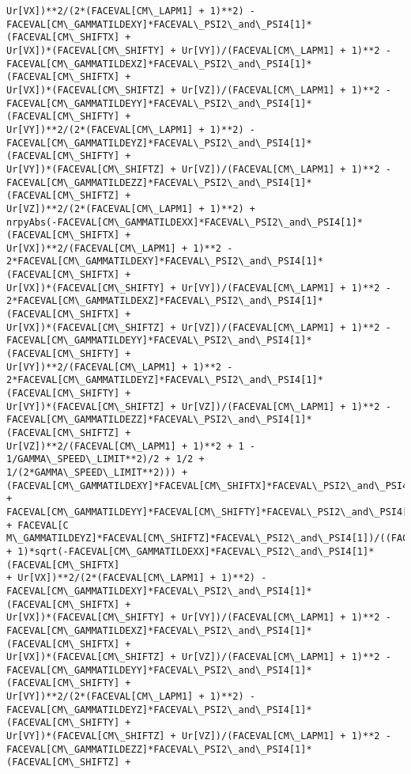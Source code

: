 \documentclass[landscape,letterpaper,10pt,english]{article}
\begin{document}
\begin{Verbatim}[commandchars=\\\{\}]
Ur[VX])**2/(2*(FACEVAL[CM\_LAPM1] + 1)**2) -
FACEVAL[CM\_GAMMATILDEXY]*FACEVAL\_PSI2\_and\_PSI4[1]*(FACEVAL[CM\_SHIFTX] +
Ur[VX])*(FACEVAL[CM\_SHIFTY] + Ur[VY])/(FACEVAL[CM\_LAPM1] + 1)**2 -
FACEVAL[CM\_GAMMATILDEXZ]*FACEVAL\_PSI2\_and\_PSI4[1]*(FACEVAL[CM\_SHIFTX] +
Ur[VX])*(FACEVAL[CM\_SHIFTZ] + Ur[VZ])/(FACEVAL[CM\_LAPM1] + 1)**2 -
FACEVAL[CM\_GAMMATILDEYY]*FACEVAL\_PSI2\_and\_PSI4[1]*(FACEVAL[CM\_SHIFTY] +
Ur[VY])**2/(2*(FACEVAL[CM\_LAPM1] + 1)**2) -
FACEVAL[CM\_GAMMATILDEYZ]*FACEVAL\_PSI2\_and\_PSI4[1]*(FACEVAL[CM\_SHIFTY] +
Ur[VY])*(FACEVAL[CM\_SHIFTZ] + Ur[VZ])/(FACEVAL[CM\_LAPM1] + 1)**2 -
FACEVAL[CM\_GAMMATILDEZZ]*FACEVAL\_PSI2\_and\_PSI4[1]*(FACEVAL[CM\_SHIFTZ] +
Ur[VZ])**2/(2*(FACEVAL[CM\_LAPM1] + 1)**2) +
nrpyAbs(-FACEVAL[CM\_GAMMATILDEXX]*FACEVAL\_PSI2\_and\_PSI4[1]*(FACEVAL[CM\_SHIFTX] +
Ur[VX])**2/(FACEVAL[CM\_LAPM1] + 1)**2 -
2*FACEVAL[CM\_GAMMATILDEXY]*FACEVAL\_PSI2\_and\_PSI4[1]*(FACEVAL[CM\_SHIFTX] +
Ur[VX])*(FACEVAL[CM\_SHIFTY] + Ur[VY])/(FACEVAL[CM\_LAPM1] + 1)**2 -
2*FACEVAL[CM\_GAMMATILDEXZ]*FACEVAL\_PSI2\_and\_PSI4[1]*(FACEVAL[CM\_SHIFTX] +
Ur[VX])*(FACEVAL[CM\_SHIFTZ] + Ur[VZ])/(FACEVAL[CM\_LAPM1] + 1)**2 -
FACEVAL[CM\_GAMMATILDEYY]*FACEVAL\_PSI2\_and\_PSI4[1]*(FACEVAL[CM\_SHIFTY] +
Ur[VY])**2/(FACEVAL[CM\_LAPM1] + 1)**2 -
2*FACEVAL[CM\_GAMMATILDEYZ]*FACEVAL\_PSI2\_and\_PSI4[1]*(FACEVAL[CM\_SHIFTY] +
Ur[VY])*(FACEVAL[CM\_SHIFTZ] + Ur[VZ])/(FACEVAL[CM\_LAPM1] + 1)**2 -
FACEVAL[CM\_GAMMATILDEZZ]*FACEVAL\_PSI2\_and\_PSI4[1]*(FACEVAL[CM\_SHIFTZ] +
Ur[VZ])**2/(FACEVAL[CM\_LAPM1] + 1)**2 + 1 - 1/GAMMA\_SPEED\_LIMIT**2)/2 + 1/2 +
1/(2*GAMMA\_SPEED\_LIMIT**2))) +
(FACEVAL[CM\_GAMMATILDEXY]*FACEVAL[CM\_SHIFTX]*FACEVAL\_PSI2\_and\_PSI4[1] +
FACEVAL[CM\_GAMMATILDEYY]*FACEVAL[CM\_SHIFTY]*FACEVAL\_PSI2\_and\_PSI4[1] + FACEVAL[C
M\_GAMMATILDEYZ]*FACEVAL[CM\_SHIFTZ]*FACEVAL\_PSI2\_and\_PSI4[1])/((FACEVAL[CM\_LAPM1]
+ 1)*sqrt(-FACEVAL[CM\_GAMMATILDEXX]*FACEVAL\_PSI2\_and\_PSI4[1]*(FACEVAL[CM\_SHIFTX]
+ Ur[VX])**2/(2*(FACEVAL[CM\_LAPM1] + 1)**2) -
FACEVAL[CM\_GAMMATILDEXY]*FACEVAL\_PSI2\_and\_PSI4[1]*(FACEVAL[CM\_SHIFTX] +
Ur[VX])*(FACEVAL[CM\_SHIFTY] + Ur[VY])/(FACEVAL[CM\_LAPM1] + 1)**2 -
FACEVAL[CM\_GAMMATILDEXZ]*FACEVAL\_PSI2\_and\_PSI4[1]*(FACEVAL[CM\_SHIFTX] +
Ur[VX])*(FACEVAL[CM\_SHIFTZ] + Ur[VZ])/(FACEVAL[CM\_LAPM1] + 1)**2 -
FACEVAL[CM\_GAMMATILDEYY]*FACEVAL\_PSI2\_and\_PSI4[1]*(FACEVAL[CM\_SHIFTY] +
Ur[VY])**2/(2*(FACEVAL[CM\_LAPM1] + 1)**2) -
FACEVAL[CM\_GAMMATILDEYZ]*FACEVAL\_PSI2\_and\_PSI4[1]*(FACEVAL[CM\_SHIFTY] +
Ur[VY])*(FACEVAL[CM\_SHIFTZ] + Ur[VZ])/(FACEVAL[CM\_LAPM1] + 1)**2 -
FACEVAL[CM\_GAMMATILDEZZ]*FACEVAL\_PSI2\_and\_PSI4[1]*(FACEVAL[CM\_SHIFTZ] +

\end{Verbatim}
\end{document}
